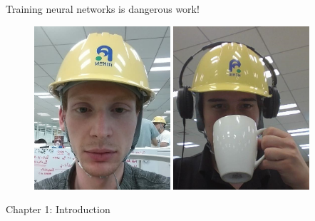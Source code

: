 \documentclass[mathserif,notheorems, hyperref={colorlinks, citecolor=blue, urlcolor=blue, linkcolor=blue}]{beamer}
\begin{document}
    \begin{frame}{Training neural networks is dangerous work!}
       
       \begin{figure}
            \centering
            \includegraphics[width=0.45\textwidth]{collaborators/helmet1} 
            \includegraphics[width=0.45\textwidth]{collaborators/helmet2} 
       \end{figure} 
    \end{frame}
  

    \begin{frame}
       \begin{center}
           \Huge Chapter 1: Introduction
       \end{center} 
    \end{frame}

\end{document}
